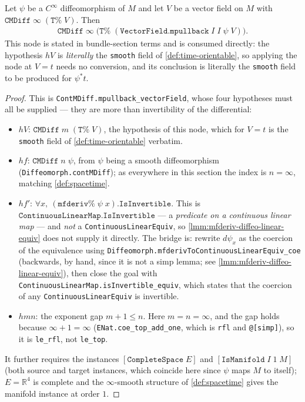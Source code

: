 \begin{lemma}
    \label{lmm:mpullback-vectorField-contMDiff-of-diffeo}
    \leanok
    Let $\psi$ be a $C^\infty$ diffeomorphism of $M$ and let $V$ be a vector field on $M$ with $\mathtt{CMDiff}\;\infty\;(\mathtt{T\%}\;V)$. Then
    \begin{align}
        \mathtt{CMDiff}\;\infty\;\big(\mathtt{T\%}\;(\mathtt{VectorField.mpullback}\;I\;I\;\psi\;V)\big).
    \end{align}
    This node is stated in bundle-section terms and is consumed directly: the hypothesis $hV$ is \emph{literally} the \texttt{smooth} field of \ref{def:time-orientable}, so applying the node at $V = t$ needs no conversion, and its conclusion is literally the \texttt{smooth} field to be produced for $\psi^*t$.
\end{lemma}
\begin{proof}
    \leanok
    This is \texttt{ContMDiff.mpullback\_vectorField}, whose four hypotheses must all be supplied --- they are more than invertibility of the differential:
    \begin{itemize}
        \item $hV$: $\mathtt{CMDiff}\;m\;(\mathtt{T\%}\;V)$, the hypothesis of this node, which for $V = t$ is the \texttt{smooth} field of \ref{def:time-orientable} verbatim.
        \item $hf$: $\mathtt{CMDiff}\;n\;\psi$, from $\psi$ being a smooth diffeomorphism (\texttt{Diffeomorph.contMDiff}); as everywhere in this section the index is $n = \infty$, matching \ref{def:spacetime}.
        \item $hf'$: $\forall x,\ (\mathtt{mfderiv\%}\;\psi\;x).\mathtt{IsInvertible}$. This is $\mathtt{ContinuousLinearMap.IsInvertible}$ --- a \emph{predicate on a continuous linear map} --- and \emph{not} a \texttt{ContinuousLinearEquiv}, so \ref{lmm:mfderiv-diffeo-linear-equiv} does not supply it directly. The bridge is: rewrite $d\psi_x$ as the coercion of the equivalence using \texttt{Diffeomorph.mfderivToContinuousLinearEquiv\_coe} (backwards, by hand, since it is not a simp lemma; see \ref{lmm:mfderiv-diffeo-linear-equiv}), then close the goal with \texttt{ContinuousLinearMap.isInvertible\_equiv}, which states that the coercion of any \texttt{ContinuousLinearEquiv} is invertible.
        \item $hmn$: the exponent gap $m + 1 \leq n$. Here $m = n = \infty$, and the gap holds because $\infty + 1 = \infty$ (\texttt{ENat.coe\_top\_add\_one}, which is \texttt{rfl} and \texttt{@[simp]}), so it is \texttt{le\_rfl}, not \texttt{le\_top}.
    \end{itemize}
    It further requires the instances $[\mathtt{CompleteSpace}\;E]$ and $[\mathtt{IsManifold}\;I\;1\;M]$ (both source and target instances, which coincide here since $\psi$ maps $M$ to itself); $E = \mathbb{R}^4$ is complete and the $\infty$-smooth structure of \ref{def:spacetime} gives the manifold instance at order $1$.
\end{proof}


